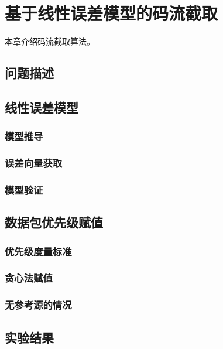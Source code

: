 \chapter{基于线性误差模型的码流截取}
本章介绍码流截取算法。

\section{问题描述}

\section{线性误差模型}

\subsection{模型推导}

\subsection{误差向量获取}

\subsection{模型验证}

\section{数据包优先级赋值}

\subsection{优先级度量标准}

\subsection{贪心法赋值}

\subsection{无参考源的情况}

\section{实验结果}
